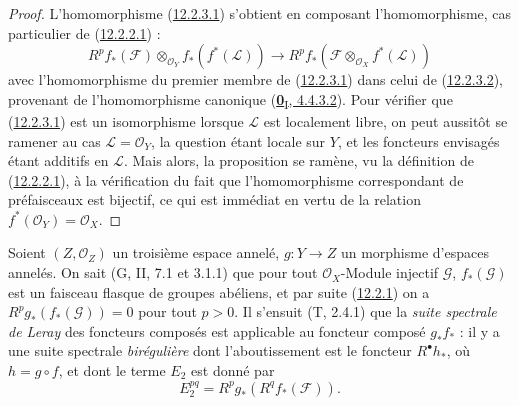 \begin{proof}
L'homomorphisme (\hyperref[0.12.2.3.1-fr]{12.2.3.1}) s'obtient en composant
l'homomorphisme, cas particulier de
(\hyperref[0.12.2.2.1-fr]{12.2.2.1}) :
\[
\label{0.12.2.3.2-fr}
\tag{12.2.3.2}
R^p f_*(\mathcal F)\otimes_{\mathcal O_Y}f_*(f^*(\mathcal L))
\longrightarrow
R^p f_*(\mathcal F\otimes_{\mathcal O_X}f^*(\mathcal L))
\]
avec l'homomorphisme du premier membre de
(\hyperref[0.12.2.3.1-fr]{12.2.3.1}) dans celui de
(\hyperref[0.12.2.3.2-fr]{12.2.3.2}), provenant de l'homomorphisme canonique
(\hyperref[0.4.4.3.2-fr]{\textbf{0}\textsubscript{I}, 4.4.3.2}). Pour vérifier que
(\hyperref[0.12.2.3.1-fr]{12.2.3.1}) est un isomorphisme lorsque $\mathcal L$
est localement libre, on peut aussitôt se ramener au cas
$\mathcal L=\mathcal O_Y$, la question étant locale sur $Y$, et les foncteurs
envisagés étant additifs en $\mathcal L$. Mais alors, la proposition se
ramène, vu la définition de (\hyperref[0.12.2.2.1-fr]{12.2.2.1}), à la
vérification du fait que l'homomorphisme correspondant de préfaisceaux est
bijectif, ce qui est immédiat en vertu de la relation
$f^*(\mathcal O_Y)=\mathcal O_X$.
\end{proof}

\begin{env}[12.2.4]
\label{0.12.2.4-fr}
Soient $(Z,\mathcal O_Z)$ un troisième espace annelé, $g:Y\to Z$ un
morphisme d'espaces annelés. On sait (G, II, 7.1 et 3.1.1) que pour tout
$\mathcal O_X$-Module injectif $\mathcal G$, $f_*(\mathcal G)$ est un
faisceau flasque de groupes abéliens, et par suite
(\hyperref[0.12.2.1-fr]{12.2.1}) on a
$R^p g_*(f_*(\mathcal G))=0$ pour tout $p>0$. Il s'ensuit (T, 2.4.1) que la
\emph{suite spectrale de Leray} des foncteurs composés est applicable au foncteur
composé $g_*f_*$ : il y a une suite spectrale \emph{birégulière} dont
l'aboutissement est le foncteur $R^\bullet h_*$, où $h=g\circ f$, et dont le
terme $E_2$ est donné par
\[
\label{0.12.2.4.1-fr}
\tag{12.2.4.1}
E_2^{pq}=R^p g_*(R^q f_*(\mathcal F)).
\]
\end{env}

